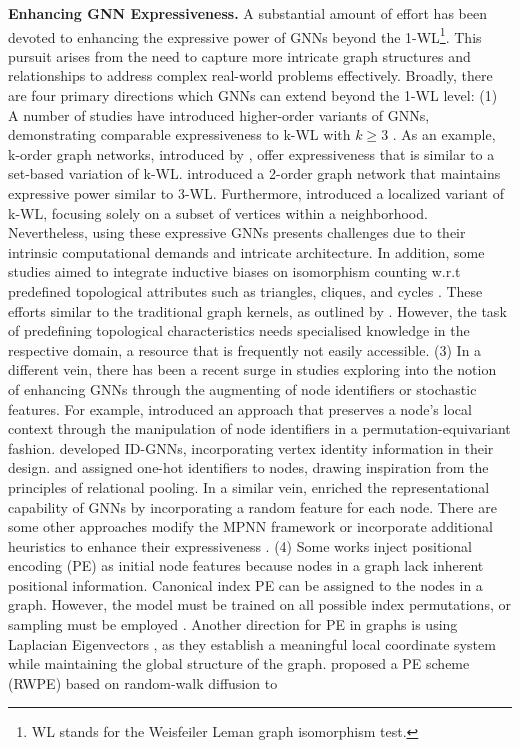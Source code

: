 \vspace{0.1cm}
\noindent
\textbf{Enhancing GNN Expressiveness. } A substantial amount of effort has been devoted to enhancing the expressive power of GNNs beyond the 1-WL\footnote{WL stands for the Weisfeiler Leman graph isomorphism test.}. This pursuit arises from the need to capture more intricate graph structures and relationships to address complex real-world problems effectively. Broadly, there are four primary directions which GNNs can extend beyond the 1-WL level: (1) A number of studies have introduced higher-order variants of GNNs, demonstrating comparable expressiveness to k-WL with $k\geq3$ \cite{azizian2020expressive}. As an example, k-order graph networks, introduced by \cite{morris2019weisfeiler}, offer expressiveness that is similar to a set-based variation of k-WL. \cite{maron2019provably} introduced a 2-order graph network that maintains expressive power similar to 3-WL. Furthermore, \cite{morris2020weisfeiler} introduced a localized variant of k-WL, focusing solely on a subset of vertices within a neighborhood. Nevertheless, using these expressive GNNs presents challenges due to their intrinsic computational demands and intricate architecture. In addition, some studies aimed to integrate inductive biases on isomorphism counting w.r.t predefined topological attributes such as triangles, cliques, and cycles \cite{bouritsas2020improving, liu2020neural, monti2018motifnet}. These efforts similar to the traditional graph kernels, as outlined by \cite{yanardag2015deep}. However, the task of predefining topological characteristics needs specialised knowledge in the respective domain, a resource that is frequently not easily accessible. (3) In a different vein, there has been a recent surge in studies exploring into the notion of enhancing GNNs through the augmenting of node identifiers or stochastic features. For example, \cite{vignac2020building} introduced an approach that preserves a node's local context through the manipulation of node identifiers in a permutation-equivariant fashion. \cite{you2021identity} developed ID-GNNs, incorporating vertex identity information in their design. \cite{chen2020can} and \cite{murphy2019relational} assigned one-hot identifiers to nodes, drawing inspiration from the principles of relational pooling. In a similar vein, \cite{sato2021random} enriched the representational capability of GNNs by incorporating a random feature for each node. There are some other approaches modify the MPNN framework or incorporate additional heuristics to enhance their expressiveness \cite{bouritsas2006improving, bodnar2021weisfeiler, wijesinghe2021new}. (4) Some works inject positional encoding (PE) as initial node features because nodes in a graph lack inherent positional information. Canonical index PE can be assigned to the nodes in a graph. However, the model must be trained on all possible index permutations, or sampling must be employed \cite{murphy2019relational}. Another direction for PE in graphs is using Laplacian Eigenvectors \cite{dwivedi2023benchmarking, dwivedi2020generalization}, as they establish a meaningful local coordinate system while maintaining the global structure of the graph. \cite{dwivedi2021graph} proposed a PE scheme (RWPE) based on random-walk diffusion to 